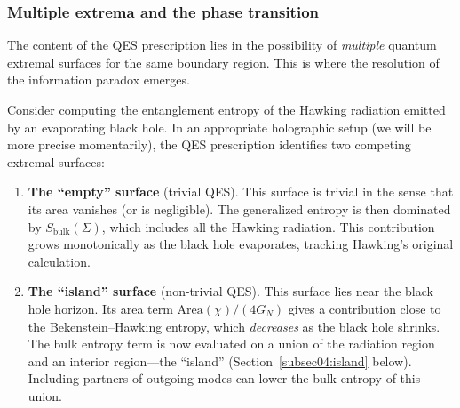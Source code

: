\documentclass[11pt,letterpaper]{article}
\theoremstyle{plain}
\theoremstyle{definition}
\theoremstyle{remark}
\begin{document}
\subsubsection*{Multiple extrema and the phase transition}

The content of the QES prescription lies in the possibility of
\emph{multiple} quantum extremal surfaces for the same boundary
region.  This is where the resolution of the information paradox
emerges.

Consider computing the entanglement entropy of the Hawking radiation
emitted by an evaporating black hole.  In an appropriate holographic
setup (we will be more precise momentarily), the QES prescription
identifies two competing extremal surfaces:

\begin{enumerate}
\item \textbf{The ``empty'' surface} (trivial QES).  This surface is
  trivial in the sense that its area vanishes (or is negligible).  The
  generalized entropy is then dominated by
  $S_{\mathrm{bulk}}(\Sigma)$, which includes all the Hawking
  radiation.  This contribution grows monotonically as the black hole
  evaporates, tracking Hawking's original calculation.

\item \textbf{The ``island'' surface} (non-trivial QES).  This
  surface lies near the black hole horizon.  Its area term
  $\mathrm{Area}(\chi)/(4G_N)$ gives a contribution close to the
  Bekenstein--Hawking entropy, which \emph{decreases} as the black
  hole shrinks.  The bulk entropy term is now evaluated on a
  union of the radiation region and an interior region---the ``island''
  (Section~\ref{subsec04:island} below). Including partners of outgoing
  modes can lower the bulk entropy of this union.
\end{enumerate}
\end{document}

